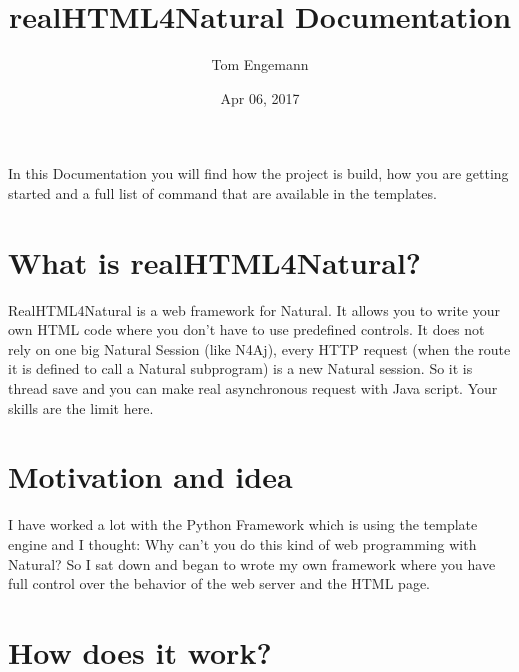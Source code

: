 \documentclass[letterpaper,10pt,english]{sphinxmanual}
\title{realHTML4Natural Documentation}
\date{Apr 06, 2017}
\author{Tom Engemann}
\begin{document}
\maketitle
\sphinxtableofcontents
{}\label{\detokenize{index::doc}}


In this Documentation you will find how the project is build, how you are getting started and a full list of command that are available in the templates.


\chapter{What is realHTML4Natural?}
\label{\detokenize{index:realhtml4natural-documentation}}\label{\detokenize{index:what-is-realhtml4natural}}
RealHTML4Natural is a web framework for Natural. It allows you to write your own HTML code where you don't have to use predefined controls. It does not rely on one big Natural Session (like N4Aj), every HTTP request (when the route it is defined to call a Natural subprogram) is a new Natural session. So it is thread save and you can make real asynchronous request with Java script.
Your skills are the limit here.


\chapter{Motivation and idea}
\label{\detokenize{index:motivation-and-idea}}
I have worked a lot with the Python Framework  which is using the template engine  and I thought: \sphinxquotedblleft{}Why can't you do this kind of web programming with Natural?\sphinxquotedblright{} So I sat down and began to wrote my own framework where you have full control over the behavior of the web server and the HTML page.


\chapter{How does it work?}
\label{\detokenize{index:how-does-it-work}}
\noindent{}
\end{document}
